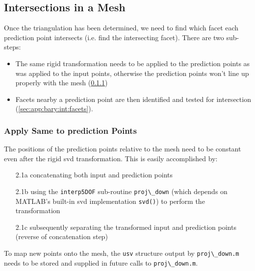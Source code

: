 \documentclass[final,twocolumn,12pt]{elsarticle}
\newcommand{\matlab}[1]{\mbox{\lstinline[style=Matlab-editor]{#1}}}
\newcommand{\inpt}{input}
\newcommand{\outpt}{prediction}
\begin{document}
\begin{appendices}
\subsection{Intersections in a  Mesh}
\label{sec:app:bary:int}

Once the triangulation has been determined, we need to find which facet each \outpt{} point intersects (i.e. find the intersecting facet). There are two sub-steps:
\begin{itemize}
    \item[2.1] The same rigid transformation needs to be applied to the \outpt{} points as was applied to the \inpt{} points, otherwise the \outpt{} points won't line up properly with the mesh (\cref{sec:app:bary:int:out-svd})
    \item[2.2] Facets nearby a \outpt{} point are then identified and tested for intersection (\cref{sec:app:bary:int:facets}).
\end{itemize}
\subsubsection{Apply Same  to \outpt{} Points}
\label{sec:app:bary:int:out-svd}
The positions of the \outpt{} points relative to the mesh need to be constant even after the rigid \gls{svd} transformation. %
This is easily accomplished by:
\begin{itemize}
    \item[2.1a] concatenating both \inpt{} and
\outpt{} points
    \item[2.1b] using the \matlab{interp5DOF} sub-routine \matlab{proj\_down} (which depends on MATLAB's built-in \gls{svd} implementation \matlab{svd()}) to perform the transformation
    \item[2.1c] subsequently separating the transformed \inpt{} and \outpt{} points (reverse of concatenation step)
\end{itemize}

To map new points onto the mesh, the \matlab{usv} structure output by \matlab{proj\_down.m} needs to be stored and supplied in future calls to \matlab{proj\_down.m}.



\end{appendices}
\end{document}
